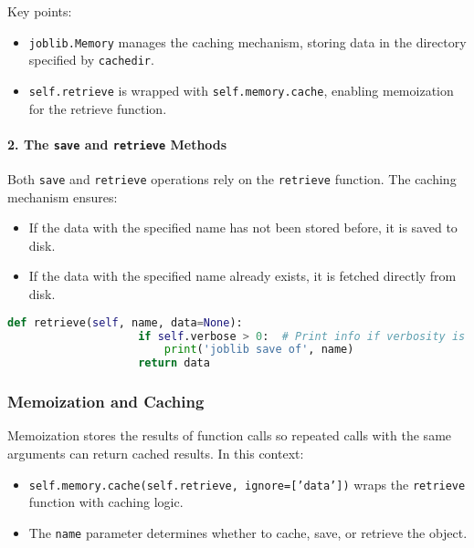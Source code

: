 \documentclass{article}
\begin{document}
			Key points:
			\begin{itemize}
				\item \texttt{joblib.Memory} manages the caching mechanism, storing data in the directory specified by \texttt{cachedir}.
				\item \texttt{self.retrieve} is wrapped with \texttt{self.memory.cache}, enabling memoization for the retrieve function.
			\end{itemize}
			
			\paragraph{2. The \texttt{save} and \texttt{retrieve} Methods}  
			Both \texttt{save} and \texttt{retrieve} operations rely on the \texttt{retrieve} function. The caching mechanism ensures:
			\begin{itemize}
				\item If the data with the specified name has not been stored before, it is saved to disk.
				\item If the data with the specified name already exists, it is fetched directly from disk.
			\end{itemize}
			
			\begin{lstlisting}[language=Python]
				def retrieve(self, name, data=None):
					if self.verbose > 0:  # Print info if verbosity is enabled
						print('joblib save of', name)
					return data
			\end{lstlisting}
			
			\begin{comment}
				
			Key points:
			\begin{itemize}
				\item The \texttt{name} parameter uniquely identifies the data object.
				\item The \texttt{data} parameter contains the object to save. If omitted, the function retrieves the stored object.
			\end{itemize}
			content...
			\end{comment}
			
			\subsubsection{Memoization and Caching}
			
			Memoization stores the results of function calls so repeated calls with the same arguments can return cached results. In this context:
			\begin{itemize}
				\item \texttt{self.memory.cache(self.retrieve, ignore=['data'])} wraps the \texttt{retrieve} function with caching logic.
				\item The \texttt{name} parameter determines whether to cache, save, or retrieve the object.
			\end{itemize}
			
\end{document}
